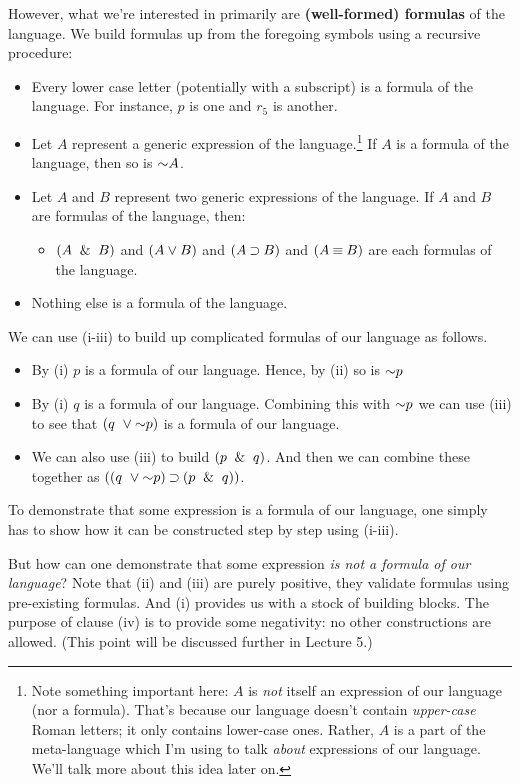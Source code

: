 \documentclass[options]{philosophersimprint}
\theoremstyle{definition}
\begin{document}
However, what we're interested in primarily are \textbf{(well-formed) formulas} of the language. We build formulas up from the foregoing symbols using a recursive procedure:
\begin{itemize}
    \item[(i)] Every lower case letter (potentially with a subscript) is a formula of the language. For instance, $p$ is one and $r_5$ is another.
    \item[(ii)] Let $A$ represent a generic expression of the language.\footnote{Note something important here: $A$ is \textit{not} itself an expression of our language (nor a formula). That's because our language doesn't contain \textit{upper-case} Roman letters; it only contains lower-case ones. Rather, $A$ is a part of the meta-language which I'm using to talk \textit{about} expressions of our language. We'll talk more about this idea later on.} If $A$ is a formula of the language, then so is $\mathord{\sim} A$.
    \item[(iii)] Let $A$ and $B$ represent two generic expressions of the language. If $A$ and $B$ are formulas of the language, then: \begin{itemize}
        \item $(A \ \mathbin{\&} \  B)$ and $(A \mathbin{\vee} B)$ and $(A \mathbin{\supset} B)$ and $(A \mathbin{\equiv} B)$ are each formulas of the language.
    \end{itemize}
    \item[(iv)] Nothing else is a formula of the language.
\end{itemize}

We can use (i-iii) to build up complicated formulas of our language as follows.
\begin{itemize}
    \item By (i) $p$ is a formula of our language. Hence, by (ii) so is $\mathord{\sim} p$
    \item By (i) $q$ is a formula of our language. Combining this with $\mathord{\sim} p$ we can use (iii) to see that $(q \ \mathbin{\vee}\mathord{\sim} p)$ is a formula of our language.
    \item We can also use (iii) to build $(p \ \mathbin{\&} \  q)$. And then we can combine these together as $((q \ \mathbin{\vee}\mathord{\sim} p)\mathbin{\supset} (p \ \mathbin{\&} \  q))$.
\end{itemize}

To demonstrate that some expression is a formula of our language, one simply has to show how it can be constructed step by step using (i-iii).

But how can one demonstrate that some expression \textit{is not a formula of our language}? Note that (ii) and (iii) are purely positive, they validate formulas using pre-existing formulas. And (i) provides us with a stock of building blocks. The purpose of clause (iv) is to provide some negativity: no other constructions are allowed. (This point will be discussed further in Lecture 5.)
\end{document}

